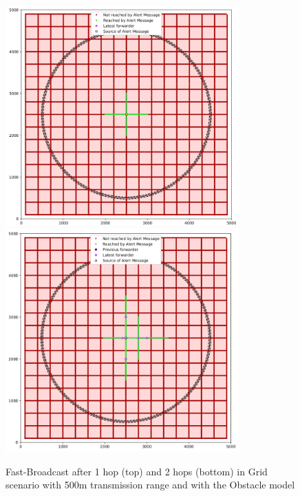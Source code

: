 		\begin{figure}[H]
			\centering
			\includegraphics[width=0.8\textwidth]{immagini/grid-300/b1/fb-1hop}
			\includegraphics[width=0.8\textwidth]{immagini/grid-300/b1/fb-2hop}
			\caption{Fast-Broadcast after 1 hop (top) and 2 hops (bottom) in Grid scenario with 500m transmission range and with the Obstacle model}
			\label{fig:fb-b1-grid-transmission} 
		\end{figure}
	
